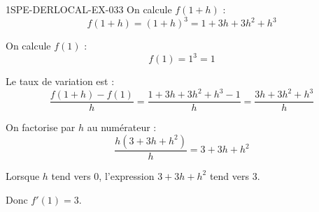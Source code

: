 \begin{corrige}{1SPE-DERLOCAL-EX-033}
On calcule $f(1+h)$ :
\[
f(1+h) = (1+h)^3 = 1 + 3h + 3h^2 + h^3
\]

On calcule $f(1)$ :
\[
f(1) = 1^3 = 1
\]

Le taux de variation est :
\[
\frac{f(1+h) - f(1)}{h} = \frac{1 + 3h + 3h^2 + h^3 - 1}{h} = \frac{3h + 3h^2 + h^3}{h}
\]

On factorise par $h$ au numérateur :
\[
\frac{h(3 + 3h + h^2)}{h} = 3 + 3h + h^2
\]

Lorsque $h$ tend vers $0$, l'expression $3 + 3h + h^2$ tend vers $3$.

Donc $\boxed{f'(1) = 3}$.
\end{corrige}
